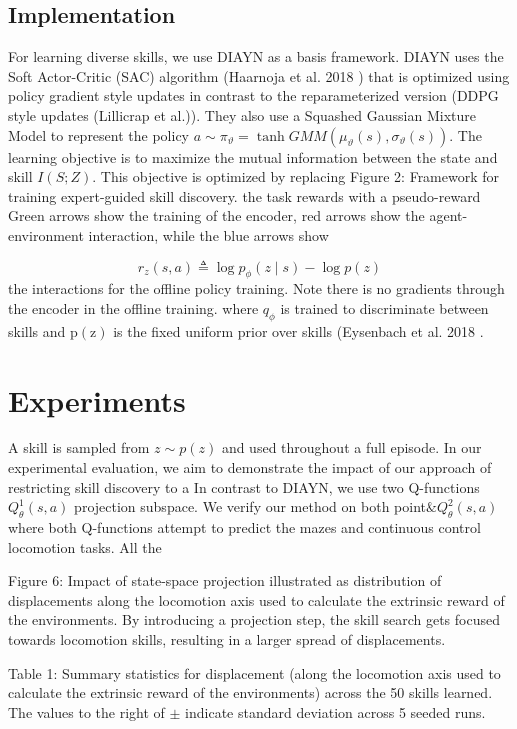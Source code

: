 \subsection{Implementation}

For learning diverse skills, we use DIAYN as a basis framework. DIAYN uses the Soft Actor-Critic (SAC) algorithm (Haarnoja et al. 2018 ) that is optimized using policy gradient style updates in contrast to the reparameterized version (DDPG style updates (Lillicrap et al.)). They also use a Squashed Gaussian Mixture Model to represent the policy $a \sim \pi_{\vartheta}=\tanh G M M\left(\mu_{\vartheta}(s), \sigma_{\vartheta}(s)\right)$. The learning objective is to maximize the mutual information between the state
and skill $I(S ; Z)$. This objective is optimized by replacing Figure 2: Framework for training expert-guided skill discovery. the task rewards with a pseudo-reward Green arrows show the training of the encoder, red arrows show the agent-environment interaction, while the blue arrows show

$$
r_{z}(s, a) \triangleq \log p_{\phi}(z \mid s)-\log p(z)
$$
the interactions for the offline policy training. Note there is no gradients through the encoder in the offline training. where $q_{\phi}$ is trained to discriminate between skills and $\mathrm{p}(\mathrm{z})$ is the fixed uniform prior over skills (Eysenbach et al. 2018 .

\section{Experiments} A skill is sampled from $z \sim p(z)$ and used throughout a full episode. In our experimental evaluation, we aim to demonstrate the impact of our approach of restricting skill discovery to a In contrast to DIAYN, we use two Q-functions $Q_{\theta}^{1}(s, a)$ projection subspace. We verify our method on both point$\& Q_{\theta}^{2}(s, a)$ where both $\mathrm{Q}$-functions attempt to predict the mazes and continuous control locomotion tasks. All the 



Figure 6: Impact of state-space projection illustrated as distribution of displacements along the locomotion axis used to calculate the extrinsic reward of the environments. By introducing a projection step, the skill search gets focused towards locomotion skills, resulting in a larger spread of displacements.

Table 1: Summary statistics for displacement (along the locomotion axis used to calculate the extrinsic reward of the environments) across the 50 skills learned. The values to the right of $\pm$ indicate standard deviation across 5 seeded runs.

